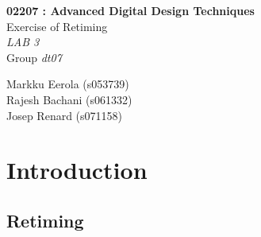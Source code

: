 \documentclass[11pt,a4paper]{article}
\begin{document}
	

\begin{titlepage}

\thispagestyle{fancy}
\lhead{}
\rhead{}
\rule{0pt}{50pt}
\vspace{3cm}

\begin{center}

 	\huge{\textbf{02207 : Advanced Digital Design Techniques}}\\
 	\vspace{1cm}
 	\huge{Exercise of Retiming}\\
 	\vspace{1cm}
 	\huge{\textit{LAB 3}}\\
 	\vspace{1cm}
 	\huge{Group \textit{dt07}}\\
\end{center}

\vspace{4cm}

\begin{flushright}
	\LARGE{Markku Eerola (s053739)}\\
	\vspace{0.3cm}
	\LARGE{Rajesh Bachani (s061332)}\\
	\vspace{0.3cm}
	\LARGE{Josep Renard (s071158)}\\
\end{flushright}
\cfoot{\today}
\end{titlepage}


\newpage 
\tableofcontents

\newpage 
\section{Introduction}
\subsection{Retiming}
\end{document}
